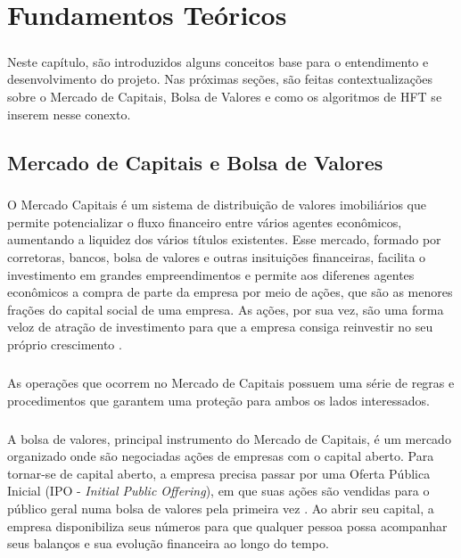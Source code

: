 \documentclass[grad,numbers]{coppe}
\begin{document}
\chapter{Fundamentos Teóricos}
  
    \paragraph{}Neste capítulo, são introduzidos alguns conceitos base para o entendimento e desenvolvimento do projeto. Nas próximas seções, são feitas contextualizações sobre o Mercado de Capitais, Bolsa de Valores e como os algoritmos de HFT se inserem nesse conexto.
    
    \section{Mercado de Capitais e Bolsa de Valores}
        \paragraph{}O Mercado Capitais é um sistema de distribuição de valores imobiliários que permite potencializar o fluxo financeiro entre vários agentes econômicos, aumentando a liquidez dos vários títulos existentes. Esse mercado, formado por corretoras, bancos, bolsa de valores e outras insituições financeiras, facilita o investimento em grandes empreendimentos e permite aos diferenes agentes econômicos a compra de parte da empresa por meio de ações, que são as menores frações do capital social de uma empresa. As ações, por sua vez, são uma forma veloz de atração de investimento para que a empresa consiga reinvestir no seu próprio crescimento \cite{barreto-mercado-capitais}.
        
        \paragraph{}As operações que ocorrem no Mercado de Capitais possuem uma série de regras e procedimentos que garantem uma proteção para ambos os lados interessados. 
        
        \paragraph{}A bolsa de valores, principal instrumento do Mercado de Capitais, é um mercado organizado onde são negociadas ações de empresas com o capital aberto. Para tornar-se de capital aberto, a empresa precisa passar por uma Oferta Pública Inicial (IPO - \textit{Initial Public Offering}), em que suas ações são vendidas para o público geral numa bolsa de valores pela primeira vez \cite{pwc-ipo}. Ao abrir seu capital, a empresa disponibiliza seus números para que qualquer pessoa possa acompanhar seus balanços e sua evolução financeira ao longo do tempo.
        
\end{document}
